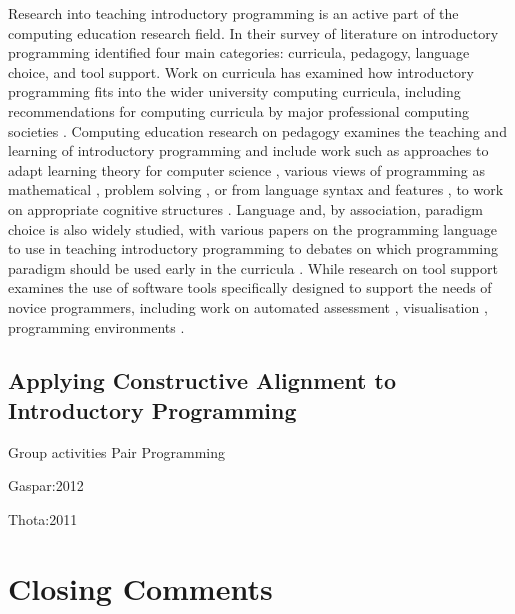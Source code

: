Research into teaching introductory programming is an active part of the computing education research field. In their survey of literature on introductory programming \citet{Pears:2007} identified four main categories: curricula, pedagogy, language choice, and tool support. Work on curricula has examined how introductory programming fits into the wider university computing curricula, including recommendations for computing curricula by major professional computing societies \cite{CC2001,CC2008}. Computing education research on pedagogy examines the teaching and learning of introductory programming and include work such as approaches to adapt learning theory for computer science \cite{BenAri:2001}, various views of programming as mathematical \cite{Denning:1989,Dijkstra:1989,Hoare:1969}, problem solving \cite{Palumbo:1990}, or from language syntax and features \cite{Robins:2003}, to work on appropriate cognitive structures \cite{Eckerdal:2005,Green:1996,Green:2000,Soloway:1986}. Language and, by association, paradigm choice is also widely studied, with various papers on the programming language to use in teaching introductory programming \cite{Anik:2011,Boszormenyi:1998,Bishop:2006,Brilliant:1996,Howell:2003,Kelleher:2005,Koffman:1988,Maloney:2010,Mannila:2006,Mannila:2006a,Mody:1991,Pendergast:2006,Roberts:1993} to debates on which programming paradigm should be used early in the curricula \cite{Astrachan:2005,Bennedsen:2004,Cooper:2003,Ehlert:2009,Howe:2004,Lister:2006a,Pattis:1993,Reges:2006}. While research on tool support examines the use of software tools specifically designed to support the needs of novice programmers, including work on automated assessment \cite{AlaMutk:2007,Douce:2005}, visualisation \cite{Naps:2002}, programming environments \cite{Gross:2005,Kelleher:2005,Kolling:2003}.




\subsection{Applying Constructive Alignment to Introductory Programming} %
\label{sub:applying_constructive_alignment_to_introductory_programming}

Group activities Pair Programming

Gaspar:2012

Thota:2011






\section{Closing Comments} %
\label{sec:closing_comments}


